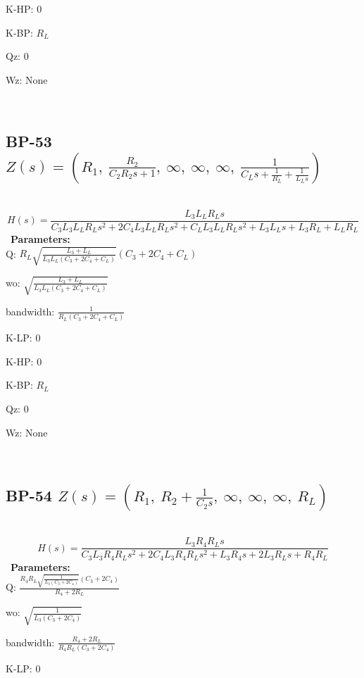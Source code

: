 \documentclass{article}
\begin{document}
K-HP: $0$\ 

K-BP: $R_{L}$\ 

Qz: $0$\ 

Wz: $\text{None}$\ 

\ 

\subsection{BP-53 $Z(s) = \left( R_{1}, \  \frac{R_{2}}{C_{2} R_{2} s + 1}, \  \infty, \  \infty, \  \infty, \  \frac{1}{C_{L} s + \frac{1}{R_{L}} + \frac{1}{L_{L} s}}\right)$ } \ 
\textbf{\[H(s) = \frac{L_{3} L_{L} R_{L} s}{C_{3} L_{3} L_{L} R_{L} s^{2} + 2 C_{4} L_{3} L_{L} R_{L} s^{2} + C_{L} L_{3} L_{L} R_{L} s^{2} + L_{3} L_{L} s + L_{3} R_{L} + L_{L} R_{L}}\] } \ 
\textbf{Parameters:}\\ 

Q: $R_{L} \sqrt{\frac{L_{3} + L_{L}}{L_{3} L_{L} \left(C_{3} + 2 C_{4} + C_{L}\right)}} \left(C_{3} + 2 C_{4} + C_{L}\right)$\ 

wo: $\sqrt{\frac{L_{3} + L_{L}}{L_{3} L_{L} \left(C_{3} + 2 C_{4} + C_{L}\right)}}$\ 

bandwidth: $\frac{1}{R_{L} \left(C_{3} + 2 C_{4} + C_{L}\right)}$\ 

K-LP: $0$\ 

K-HP: $0$\ 

K-BP: $R_{L}$\ 

Qz: $0$\ 

Wz: $\text{None}$\ 

\ 

\subsection{BP-54 $Z(s) = \left( R_{1}, \  R_{2} + \frac{1}{C_{2} s}, \  \infty, \  \infty, \  \infty, \  R_{L}\right)$ } \ 
\textbf{\[H(s) = \frac{L_{3} R_{4} R_{L} s}{C_{3} L_{3} R_{4} R_{L} s^{2} + 2 C_{4} L_{3} R_{4} R_{L} s^{2} + L_{3} R_{4} s + 2 L_{3} R_{L} s + R_{4} R_{L}}\] } \ 
\textbf{Parameters:}\\ 

Q: $\frac{R_{4} R_{L} \sqrt{\frac{1}{L_{3} \left(C_{3} + 2 C_{4}\right)}} \left(C_{3} + 2 C_{4}\right)}{R_{4} + 2 R_{L}}$\ 

wo: $\sqrt{\frac{1}{L_{3} \left(C_{3} + 2 C_{4}\right)}}$\ 

bandwidth: $\frac{R_{4} + 2 R_{L}}{R_{4} R_{L} \left(C_{3} + 2 C_{4}\right)}$\ 

K-LP: $0$\ 
\end{document}
